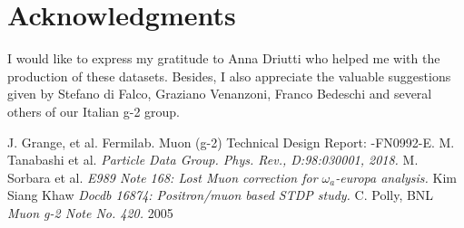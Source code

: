 \documentclass[article,accept,moreauthors,pdftex,10pt,a4paper]{../MDPI_template/Definitions/mdpi}
\begin{document}
\section*{Acknowledgments}
\noindent I would like to express my gratitude to Anna Driutti who helped me with the production of these datasets. 
Besides, I also appreciate the valuable suggestions given by Stefano di Falco, Graziano Venanzoni, Franco Bedeschi 
and several others of our Italian g-2 group. 

\begin{thebibliography}{999}
J. Grange, et al. Fermilab. Muon (g-2) Technical Design Report: -FN0992-E.
M. Tanabashi et al. {\em Particle Data Group. Phys. Rev., D:98:030001, 2018.}
M. Sorbara et al. {\em E989 Note 168: Lost Muon correction for $\omega_a$-europa analysis.}
Kim Siang Khaw {\em Docdb 16874: Positron/muon based STDP study.}
C. Polly, BNL {\em Muon g-2 Note No. 420.} {2005}
\end{thebibliography}
\end{document}
